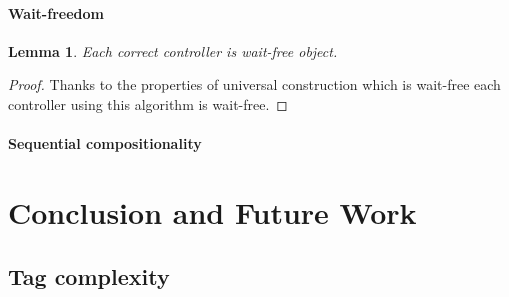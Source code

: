 \documentclass{article}
\newtheorem{lemma}{Lemma}
\theoremstyle{remark}
\begin{document}
\paragraph{Wait-freedom}
\begin{lemma}
Each correct controller is wait-free object.
\end{lemma}
\begin{proof}
Thanks to the properties of universal construction which is wait-free each controller using this algorithm is wait-free.
\end{proof}
\paragraph{Sequential compositionality}
%
%
\section{Conclusion and Future Work}
\subsection{Tag complexity}



\end{document}
